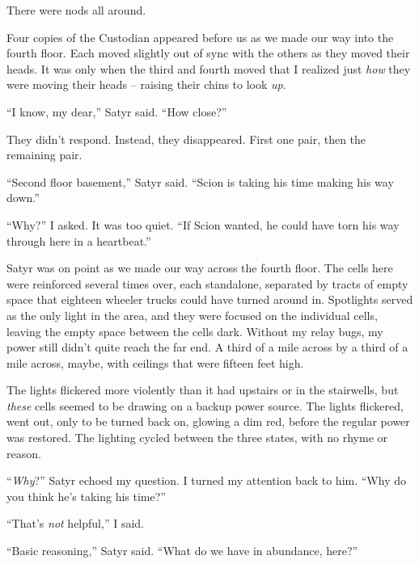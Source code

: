 There were nods all around.



Four copies of the Custodian appeared before us as we made our way into the fourth floor.  Each moved slightly out of sync with the others as they moved their heads.  It was only when the third and fourth moved that I realized just \emph{how} they were moving their heads – raising their chins to look \emph{up}.



``I know, my dear,'' Satyr said.  ``How close?''



They didn't respond.  Instead, they disappeared.  First one pair, then the remaining pair.



``Second floor basement,'' Satyr said.  ``Scion is taking his time making his way down.''



``Why?'' I asked.  It was too quiet.  ``If Scion wanted, he could have torn his way through here in a heartbeat.''



Satyr was on point as we made our way across the fourth floor.  The cells here were reinforced several times over, each standalone, separated by tracts of empty space that eighteen wheeler trucks could have turned around in.  Spotlights served as the only light in the area, and they were focused on the individual cells, leaving the empty space between the cells dark.  Without my relay bugs, my power still didn't quite reach the far end.  A third of a mile across by a third of a mile across, maybe, with ceilings that were fifteen feet high.



The lights flickered more violently than it had upstairs or in the stairwells, but \emph{these} cells seemed to be drawing on a backup power source.  The lights flickered, went out, only to be turned back on, glowing a dim red, before the regular power was restored.  The lighting cycled between the three states, with no rhyme or reason.



``\emph{Why}?'' Satyr echoed my question.  I turned my attention back to him.  ``Why do you think he's taking his time?''



``That's \emph{not} helpful,'' I said.



``Basic reasoning,'' Satyr said.  ``What do we have in abundance, here?''



